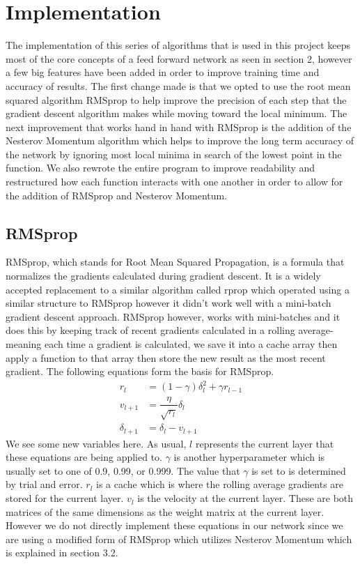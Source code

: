 \documentclass[12pt]{article}
\theoremstyle{definition}
\theoremstyle{plain}
\begin{document}
\section{Implementation}
The implementation of this series of algorithms that is used in this project keeps most of the core concepts of a feed forward network as seen in section 2, however a few big features have been added in order to improve training time and accuracy of results. The first change made is that we opted to use the root mean squared algorithm RMSprop to help improve the precision of each step that the gradient descent algorithm makes while moving toward the local minimum. The next improvement that works hand in hand with RMSprop is the addition of the Nesterov Momentum algorithm which helps to improve the long term accuracy of the network by ignoring most local minima in search of the lowest point in the function\cite{ruder_2016}. We also rewrote the entire program to improve readability and restructured how each function interacts with one another in order to allow for the addition of RMSprop and Nesterov Momentum\cite{readthedocs,ruder_2016}.

\subsection{RMSprop}
RMSprop, which stands for Root Mean Squared Propagation, is a formula that normalizes the gradients calculated during gradient descent. It is a widely accepted replacement to a similar algorithm called rprop which operated using a similar structure to RMSprop however it didn't work well with a mini-batch gradient descent approach\cite{hinton}. RMSprop however, works with mini-batches and it does this by keeping track of recent gradients calculated in a rolling average\-- meaning each time a gradient is calculated, we save it into a cache array then apply a function to that array then store the new result as the most recent gradient. The following equations form the basis for RMSprop\cite{readthedocs}.
\begin{align}\label{eqn:RMSprop}
r_l &= (1-\gamma)\delta_l^2 + \gamma r_{l-1}\\
v_{l+1} &= \dfrac{\eta}{\sqrt{r_l}}\delta_l\\
\delta_{l+1} &= \delta_l - v_{l+1}
\end{align}
We see some new variables here. As usual, $l$ represents the current layer that these equations are being applied to. $\gamma$ is another hyperparameter which is usually set to one of 0.9, 0.99, or 0.999\cite{cs321n}. The value that $\gamma$ is set to is determined by trial and error. $r_l$ is a cache which is where the rolling average gradients are stored for the current layer. $v_l$ is the velocity at the current layer. These are both matrices of the same dimensions as the weight matrix at the current layer. However we do not directly implement these equations in our network since we are using a modified form of RMSprop which utilizes Nesterov Momentum which is explained in section 3.2.
\end{document}
